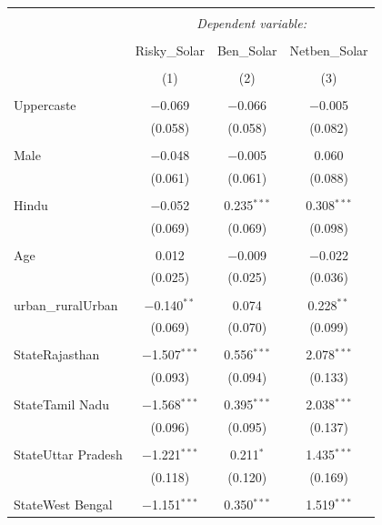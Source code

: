 \documentclass[
]{article}
\begin{document}
\begin{table}[!htbp] \centering 
  \caption{} 
  \label{} 
\begin{tabular}{@{\extracolsep{5pt}}lccc} 
\\[-1.8ex]\hline 
\hline \\[-1.8ex] 
 & \multicolumn{3}{c}{\textit{Dependent variable:}} \\ 
\cline{2-4} 
\\[-1.8ex] & Risky\_Solar & Ben\_Solar & Netben\_Solar \\ 
\\[-1.8ex] & (1) & (2) & (3)\\ 
\hline \\[-1.8ex] 
 Uppercaste & $-$0.069 & $-$0.066 & $-$0.005 \\ 
  & (0.058) & (0.058) & (0.082) \\ 
  & & & \\ 
 Male & $-$0.048 & $-$0.005 & 0.060 \\ 
  & (0.061) & (0.061) & (0.088) \\ 
  & & & \\ 
 Hindu & $-$0.052 & 0.235$^{***}$ & 0.308$^{***}$ \\ 
  & (0.069) & (0.069) & (0.098) \\ 
  & & & \\ 
 Age & 0.012 & $-$0.009 & $-$0.022 \\ 
  & (0.025) & (0.025) & (0.036) \\ 
  & & & \\ 
 urban\_ruralUrban & $-$0.140$^{**}$ & 0.074 & 0.228$^{**}$ \\ 
  & (0.069) & (0.070) & (0.099) \\ 
  & & & \\ 
 StateRajasthan & $-$1.507$^{***}$ & 0.556$^{***}$ & 2.078$^{***}$ \\ 
  & (0.093) & (0.094) & (0.133) \\ 
  & & & \\ 
 StateTamil Nadu & $-$1.568$^{***}$ & 0.395$^{***}$ & 2.038$^{***}$ \\ 
  & (0.096) & (0.095) & (0.137) \\ 
  & & & \\ 
 StateUttar Pradesh & $-$1.221$^{***}$ & 0.211$^{*}$ & 1.435$^{***}$ \\ 
  & (0.118) & (0.120) & (0.169) \\ 
  & & & \\ 
 StateWest Bengal & $-$1.151$^{***}$ & 0.350$^{***}$ & 1.519$^{***}$ \\ 

\end{tabular}
\end{table}
\end{document}
